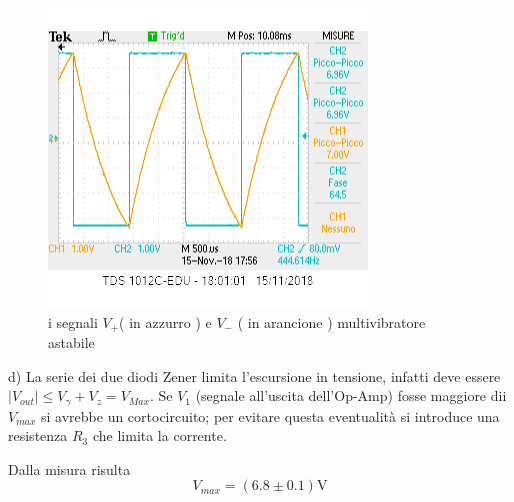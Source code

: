 \documentclass[10pt,a4paper]{article}
\begin{document}
\begin{figure}[h]
	\begin{center}
			\includegraphics[scale=0.8]{v+_v-.png}
		\caption{\small i segnali $V_+$( in azzurro ) e $ V_-$ ( in arancione )  multivibratore astabile}
		\label{fig:V+V-}
	\end{center}

\end{figure}



d) La serie dei due  diodi  Zener limita l'escursione in tensione, infatti deve essere $|V_{out}| \le V_{\gamma} +V_{z} = V_{Max}$.
 Se $V_{1}$ (segnale all'uscita dell'Op-Amp) fosse maggiore dii $V_{max}$ si avrebbe un cortocircuito; per evitare questa eventualità si introduce  una resistenza $R_3$ che limita la corrente.

Dalla misura risulta \[V_{max} = ( 6.8\pm 0.1) \si \volt\]
\end{document}
